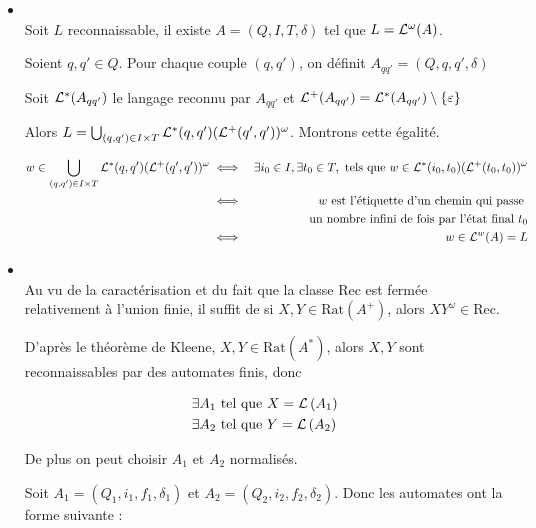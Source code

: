 \begin{proofI}
	\begin{itemize}
		\item \bimpRL \\
		      Soit $L$ reconnaissable, il existe $A = (Q,I,T,\delta)$ tel que $L = \mathcal{L}^{\omega}(A)$.

		      Soient $q,q' \in Q$. Pour chaque couple $(q,q')$, on définit $A_{qq'} = (Q,q,q',\delta)$

		      Soit $\mathcal{L}^*(A_{qq'})$ le langage reconnu par $A_{qq'}$ et $\mathcal{L}^+(A_{qq'}) = \mathcal{L}^*(A_{qq'}) \setminus \left\{\varepsilon\right\}$

		      Alors $L = \bigcup_{(q,q') \in I \times T} \mathcal{L}^*(q,q')(\mathcal{L}^+(q',q'))^{\omega}$. Montrons cette égalité.

		      \begin{eqnarray*}
			      w \in \bigcup_{(q,q') \in I \times T} \mathcal{L}^*(q,q')(\mathcal{L}^+(q',q'))^{\omega} &\iff& \exists i_0 \in I, \exists t_0 \in T, \text{ tels que } w \in \mathcal{L}^*(i_0,t_0)(\mathcal{L}^+(t_0,t_0))^{\omega} \\
			      &\iff& w \text{ est l'étiquette d'un chemin qui passe } \\
			      & & \text{ un nombre infini de fois par l'état final } t_0 \\
			      &\iff& w\in \mathcal{L}^w (A) = L
		      \end{eqnarray*}

		\item \bimpLR \\
		      Au vu de la caractérisation et du fait que la classe Rec est fermée relativement à l'union finie, il suffit de \mq si
		      $X,Y \in \text{Rat}(A^+)$, alors $XY^{\omega} \in \text{Rec}$.

		      D'après le théorème de Kleene, $X,Y \in \text{Rat} (A^*)$, alors $X,Y$ sont reconnaissables par des automates finis, donc

		      \begin{eqnarray*}
			      &\exists A_1 \text{ tel que } X = \mathcal{L}\left(A_1\right) \\
			      &\exists A_2 \text{ tel que } Y = \mathcal{L}\left(A_2\right)
		      \end{eqnarray*}

		      De plus on peut choisir $A_1$ et $A_2$ normalisés.

		      Soit $A_1 = (Q_1, i_1, f_1, \delta_1)$ et $A_2 = (Q_2, i_2, f_2, \delta_2)$.
		      Donc les automates ont la forme suivante :

		      \begin{automata}
\end{automata}
\end{itemize}
\end{proofI}
